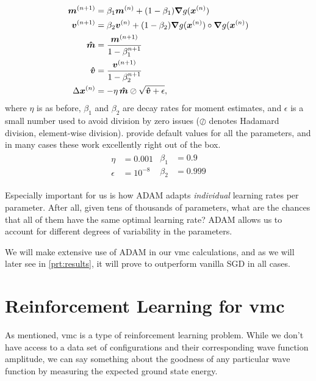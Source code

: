 \documentclass[Thesis.tex]{subfiles}
\begin{document}
\begin{align}
  \bm{m}^{(n+1)} &= \beta_1 \bm{m}^{(n)} + (1 - \beta_1)\grad{g(\bm{x}^{(n)})}\\
  \bm{v}^{(n+1)} &= \beta_2 \bm{v}^{(n)} + (1 - \beta_2)\grad{g(\bm{x}^{(n)})}\circ\grad{g(\bm{x}^{(n)})}\\
  \bm{\hat m} &= \frac{\bm{m}^{(n+1)}}{1 - \beta_1^{n+1}}\\
  \bm{\hat v} &= \frac{\bm{v}^{(n+1)}}{1 - \beta_2^{n+1}}\\
  \Delta \bm{x}^{(n)}&= -\eta\, \bm{\hat m}\oslash\sqrt{\bm{\hat v} + \epsilon},
\end{align}
where $\eta$ is as before, $\beta_1$ and $\beta_2$ are decay rates for moment
estimates, and $\epsilon$ is a small number used to avoid division by zero
issues ($\oslash$ denotes Hadamard division, element-wise division). \textcite{KingmaB14} provide default values for all the parameters, and
in many cases these work excellently right out of the box.
\begin{align}
  \label{eq:adam-default-parameters}
  \begin{split}
    \eta &= 0.001\\
    \epsilon &= 10^{-8}
  \end{split}
  \begin{split}
    \beta_1 &= 0.9\\
    \beta_2 &= 0.999
  \end{split}
\end{align}

Especially important for us is how ADAM adapts \emph{individual} learning rates
per parameter. After all, given tens of thousands of parameters, what are the
chances that all of them have the same optimal learning rate? ADAM allows us to
account for different degrees of variability in the parameters.

We will make extensive use of ADAM in our \gls{vmc} calculations, and as we will later
see in \cref{prt:results}, it will prove to outperform vanilla SGD in all cases.

\section{Reinforcement Learning for \gls{vmc}}
\label{sec:reinf-learning-for-vmc}

As mentioned, \gls{vmc} is a type of reinforcement learning problem. While we don't
have access to a data set of configurations and their corresponding wave
function amplitude, we can say something about the goodness of any particular
wave function by measuring the expected ground state energy.
\end{document}
